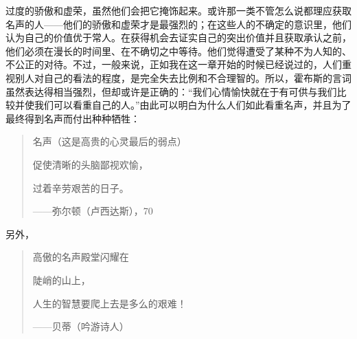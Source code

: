 \documentclass[12pt,oneside]{book}
\begin{document}
过度的骄傲和虚荣，虽然他们会把它掩饰起来。或许那一类不管怎么说都理应获取名声的人——他们的骄傲和虚荣才是最强烈的；在这些人的不确定的意识里，他们认为自己的价值优于常人。在获得机会去证实自己的突出价值并且获取承认之前，他们必须在漫长的时间里、在不确切之中等待。他们觉得遭受了某种不为人知的、不公正的对待。不过，一般来说，正如我在这一章开始的时候已经说过的，人们重视别人对自己的看法的程度，是完全失去比例和不合理智的。所以，霍布斯的言词虽然表达得相当强烈，但却或许是正确的：“我们心情愉快就在于有可供与我们比较并使我们可以看重自己的人。”由此可以明白为什么人们如此看重名声，并且为了最终得到名声而付出种种牺牲： 


\begin{quotation}
名声（这是高贵的心灵最后的弱点） 

促使清晰的头脑鄙视欢愉， 

过着辛劳艰苦的日子。 

——弥尔顿（卢西达斯），70 
\end{quotation}
 

另外， 

 
\begin{quotation}
高傲的名声殿堂闪耀在 

陡峭的山上，

人生的智慧要爬上去是多么的艰难！ 

——贝蒂（吟游诗人） 
\end{quotation}
 
\end{document}
